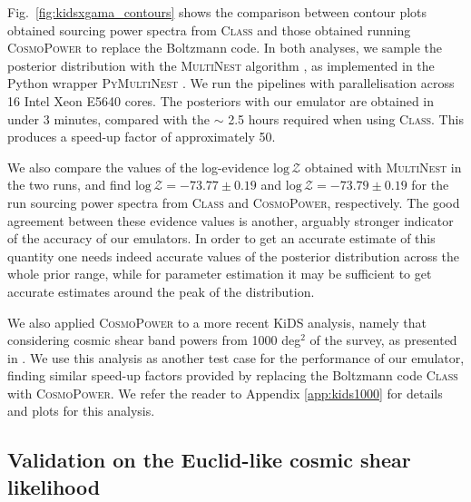 \documentclass[fleqn,usenatbib]{mnras}
\begin{document}
Fig.~\ref{fig:kidsxgama_contours} shows the comparison between contour plots obtained sourcing power spectra from \textsc{Class} and those obtained running \textsc{CosmoPower} to replace the Boltzmann code. In both analyses, we sample the posterior distribution with the \textsc{MultiNest} algorithm \citep{Feroz09}, as implemented in the Python wrapper \textsc{PyMultiNest} \citep{Buchner14}. We run the pipelines with parallelisation across 16 Intel Xeon E5640 cores. The posteriors with our emulator are obtained in under 3 minutes, compared with the $\sim$ 2.5 hours required when using \textsc{Class}. This produces a speed-up factor of approximately 50. 

We also compare the values of the log-evidence $\mathrm{log} \, \mathcal{Z}$ obtained with \textsc{MultiNest} in the two runs, and find $\mathrm{log} \, \mathcal{Z} = -73.77 \pm 0.19$ and $\mathrm{log} \, \mathcal{Z} = -73.79 \pm 0.19$ for the run sourcing power spectra from \textsc{Class} and \textsc{CosmoPower}, respectively. The good agreement between these evidence values is another, arguably stronger indicator of the accuracy of our emulators. In order to get an accurate estimate of this quantity one needs indeed accurate values of the posterior distribution across the whole prior range, while for parameter estimation it may be sufficient to get accurate estimates around the peak of the distribution.

We also applied \textsc{CosmoPower} to a more recent KiDS analysis, namely that considering cosmic shear band powers from 1000 deg$^2$ of the survey, as presented in \citet{Asgari20}. We use this analysis as another test case for the performance of our emulator, finding similar speed-up factors provided by replacing the Boltzmann code \textsc{Class} with \textsc{CosmoPower}. We refer the reader to Appendix \ref{app:kids1000} for details and plots for this analysis.

\subsection{Validation on the Euclid-like cosmic shear likelihood}\label{sec:euclid}
\end{document}
